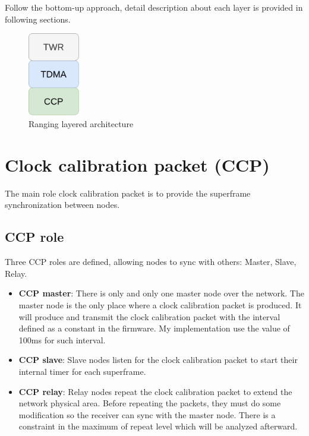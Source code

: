 \documentclass[\main/main.tex]{subfiles}
\begin{document}
Follow the bottom-up approach, detail description about each layer is provided in following sections.
\begin{figure}[H]
    \begin{center}
        \includegraphics[width=0.2\textwidth]{ranging_layered_architecture}
    \end{center}
    \caption{Ranging layered architecture}
    \label{fig:ranging_layered_architecture}
\end{figure}

\section{Clock calibration packet (CCP)}
The main role clock calibration packet is to provide the superframe synchronization between nodes. 
\subsection{CCP role}
Three CCP roles are defined, allowing nodes to sync with others: Master, Slave, Relay.
\begin{itemize}
    \item \textbf{CCP master}: There is only and only one master node over the network. The master node is the only place where a clock calibration packet is produced. It will produce and transmit the clock calibration packet with the interval defined as a constant in the firmware. My implementation use the value of 100ms for such interval. 
    \item \textbf{CCP slave}: Slave nodes listen for the clock calibration packet to start their internal timer for each superframe.
    \item \textbf{CCP relay}: Relay nodes repeat the clock calibration packet to extend the network physical area. Before repeating the packets, they must do some modification so the receiver can sync with the  master node. There is a constraint in the maximum of repeat level which will be analyzed afterward.
\end{itemize}
\end{document}
